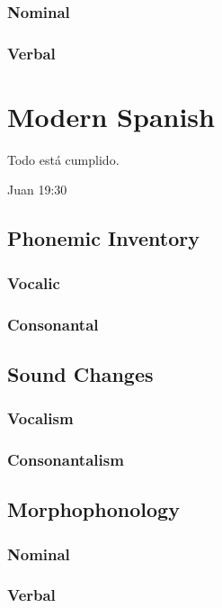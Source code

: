 \documentclass{report}
\begin{document}
\subsection{Nominal}

\subsection{Verbal}

\chapter{Modern Spanish}

\epigraph{Todo está cumplido.}{Juan 19:30}

\section{Phonemic Inventory}

\subsection{Vocalic}

\subsection{Consonantal}

\section{Sound Changes}

\subsection{Vocalism}

\subsection{Consonantalism}

\section{Morphophonology}

\subsection{Nominal}

\subsection{Verbal}
\end{document}

